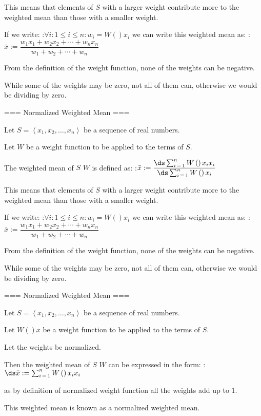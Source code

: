 This means that elements of $S$ with a larger weight contribute more to the weighted mean than those with a smaller weight.


If we write:
:$\forall i: 1 \le i \le n: w_i = W \left(   \right){x_i}$
we can write this weighted mean as:
:$\bar x := \dfrac {w_1 x_1 + w_2 x_2 + \cdots + w_n x_n} {w_1 + w_2 + \cdots + w_n}$


From the definition of the weight function, none of the weights can be negative.

While some of the weights may be zero, not all of them can, otherwise we would be dividing by zero.


=== Normalized Weighted Mean ===

Let $S = \left\langle x_1, x_2, \ldots, x_n \right\rangle$ be a sequence of real numbers.

Let $W$ be a weight function to be applied to the terms of $S$.


The weighted mean of $S$  $W$ is defined as:
:$\bar x := \dfrac {\ds \sum_{i \mathop = 1}^n W \left(   \right){x_i} x_i} {\ds \sum_{i \mathop = 1}^n W \left(   \right){x_i} }$

This means that elements of $S$ with a larger weight contribute more to the weighted mean than those with a smaller weight.


If we write:
:$\forall i: 1 \le i \le n: w_i = W \left(   \right){x_i}$
we can write this weighted mean as:
:$\bar x := \dfrac {w_1 x_1 + w_2 x_2 + \cdots + w_n x_n} {w_1 + w_2 + \cdots + w_n}$


From the definition of the weight function, none of the weights can be negative.

While some of the weights may be zero, not all of them can, otherwise we would be dividing by zero.


=== Normalized Weighted Mean ===

Let $S = \left\langle x_1, x_2, \ldots, x_n \right\rangle$ be a sequence of real numbers.

Let $W \left(   \right)x$ be a weight function to be applied to the terms of $S$.

Let the weights be normalized.

Then the weighted mean of $S$  $W$ can be expressed in the form:
:$\ds \bar x := \sum_{i \mathop = 1}^n W \left(   \right){x_i} x_i$

as by definition of normalized weight function all the weights add up to $1$.

This weighted mean is known as a  normalized weighted mean.



